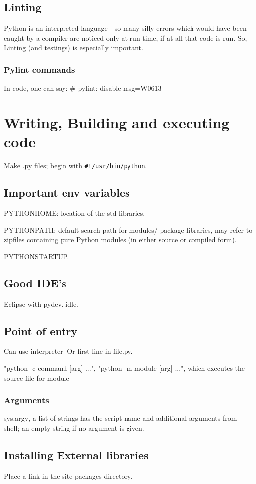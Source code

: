 \subsection{Linting}
Python is an interpreted language - so many silly errors which would have been caught by a compiler are noticed only at run-time, if at all that code is run. So, Linting (and testings) is especially important.

\subsubsection{Pylint commands}
In code, one can say:
\# pylint: disable-msg=W0613

\section{Writing, Building and executing code}
Make .py files; begin with \verb'#!/usr/bin/python'.

\subsection{Important env variables}
PYTHONHOME: location of the std libraries.

PYTHONPATH: default search path for modules/ package libraries, may refer to zipfiles containing pure Python modules (in either source or compiled form).

PYTHONSTARTUP.

\subsection{Good IDE's}
Eclipse with pydev. idle.

\subsection{Point of entry}
Can use interpreter. Or first line in file.py.

"python -c command [arg] ...", "python -m module [arg] ...", which executes the source file for module

\subsubsection{Arguments}
sys.argv, a list of strings has the script name and additional arguments from shell; an empty string if no argument is given.

\subsection{Installing External libraries}
Place a link in the site-packages directory.

